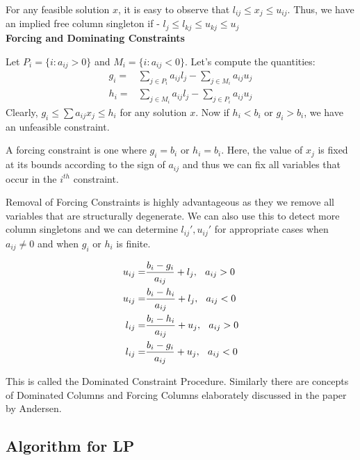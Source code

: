 \documentclass[twoside]{article}
\begin{document}
\begin{multicols}{2}
	For any feasible solution $x$, it is easy to observe that $l_{ij} \leq x_j \leq u_{ij}$. Thus, we have an implied free column singleton if - $l_j \leq l_{kj} \leq u_{kj} \leq u_j$ \\
	\textbf{\color{blue}Forcing and Dominating Constraints}

Let $P_i = \{i : a_{ij} > 0\}$ and $M_i = \{i : a_{ij} < 0\}$. Let's compute the quantities:
\begin{align*}
	g_{i} = & \sum_{j \in P_{i} } a_{ij}l_j - \sum_{j \in M_{i}} a_{ij}u_j \\
	h_{i} = & \sum_{j \in M_{i} } a_{ij}l_j - \sum_{j \in P_{i}} a_{ij}u_j 
\end{align*}
Clearly, $g_i \leq \sum a_{ij}x_j \leq h_i$ for any solution $x$. Now if $h_i < b_i$ or $g_i > b_i$, we have an unfeasible constraint. 

A forcing constraint is one where $g_i = b_i$ or $h_i = b_i$. Here, the value of $x_j$ is fixed at its bounds according to the sign of $a_{ij}$ and thus we can fix all variables that occur in the $i^{th}$ constraint. 

Removal of Forcing Constraints is highly advantageous as they we remove all variables that are structurally degenerate. We can also use this to detect more column singletons and we can determine $l_{ij}', u_{ij}'$ for appropriate cases when $a_{ij} \neq 0 $ and when $g_i$ or $h_i$ is finite.

\begin{align*}
    u_{ij} = & \frac{b_i - g_i}{a_{ij}} + l_j, \hspace{0.1in}  a_{ij} > 0 \\
	u_{ij} = & \frac{b_i - h_i}{a_{ij}} + l_j, \hspace{0.1in}  a_{ij} < 0 \\		
	l_{ij} = & \frac{b_i - h_i}{a_{ij}} + u_j, \hspace{0.1in}  a_{ij} > 0 \\
	l_{ij} = & \frac{b_i - g_i}{a_{ij}} + u_j, \hspace{0.1in}  a_{ij} < 0 		
\end{align*}

This is called the Dominated Constraint Procedure. Similarly there are concepts of Dominated Columns and Forcing Columns elaborately discussed in the paper by Andersen. 
\vspace*{-\baselineskip}

\subsection{\textbf{Algorithm for LP}}


\end{multicols}
\end{document}
